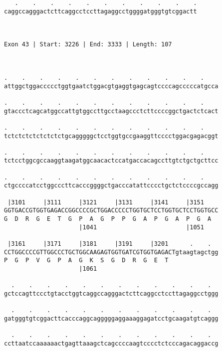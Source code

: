 \documentclass{article}
\begin{document}
\begin{Verbatim}
   .    .    .    .    .    .    .    .    .    .    .
caggccagggactcttcaggcctccttagaggcctggggatgggtgtcggactt
                                                      
                                                      
 
Exon 43 | Start: 3226 | End: 3333 | Length: 107



.    .    .    .    .    .    .    .    .    .    .    .    
attggctggaccccctggtgaatctggacgtgaggtgagcagtccccagcccccatgcca
                                                            
.    .    .    .    .    .    .    .    .    .    .    .    
gtaccctcagcatggccattgtggccttgcctaagccctcttccccggctgactctcact
                                                            
.    .    .    .    .    .    .    .    .    .    .    .    
tctctctctctctctctgcagggggctcctggtgccgaaggttcccctggacgagacggt
                                                            
.    .    .    .    .    .    .    .    .    .    .    .    
tctcctggcgccaaggtaagatggcaacactccatgaccacagccttgtctgctgcttcc
                                                            
.    .    .    .    .    .    .    .    .    .    .    .    
ctgccccatcctggcccttcacccggggctgacccatattcccctgctctccccgccagg
                                                            
 |3101     |3111     |3121     |3131     |3141     |3151    
GGTGACCGTGGTGAGACCGGCCCCGCTGGACCCCCTGGTGCTCCTGGTGCTCCTGGTGCC
G  D  R  G  E  T  G  P  A  G  P  P  G  A  P  G  A  P  G  A  
                     |1041                         |1051    
  
 |3161     |3171     |3181     |3191     |3201      .    .  
CCTGGCCCCGTTGGCCCTGCTGGCAAGAGTGGTGATCGTGGTGAGACTgtaagtagctgg
P  G  P  V  G  P  A  G  K  S  G  D  R  G  E  T              
                     |1061                                  
  
  .    .    .    .    .    .    .    .    .    .    .    .  
gctccagttccctgtacctggtcaggccagggactcttcaggcctccttagaggcctggg
                                                            
  .    .    .    .    .    .    .    .    .    .    .    .  
gatgggtgtcggacttcacccaggcagggggaggaaaggagatcctgcaagatgtcaggg
                                                            
  .    .    .    .    .    .    .    .    .    .    .    .  
ccttaatccaaaaaactgagttaaagctcagccccaagtcccctctcccagacaggaccg
                                                            

\end{Verbatim}
\end{document}
